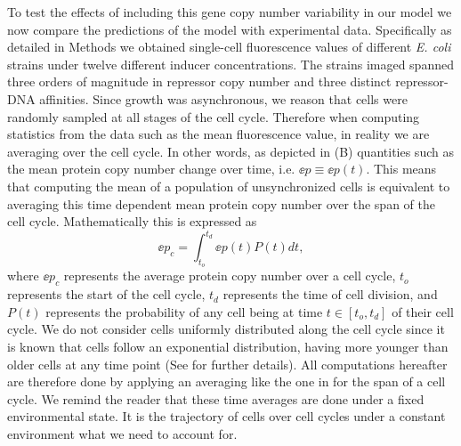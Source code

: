 To test the effects of including this gene copy number variability in our model
we now compare the predictions of the model with experimental data.
Specifically as detailed in Methods we obtained single-cell fluorescence values
of different {\it E. coli} strains under twelve different inducer
concentrations. The strains imaged spanned three orders of magnitude in
repressor copy number and three distinct repressor-DNA affinities. Since growth
was asynchronous, we reason that cells were randomly sampled at all stages of
the cell cycle. Therefore when computing statistics from the data such as the
mean fluorescence value, in reality we are averaging over the cell cycle. In
other words, as depicted in (B) quantities such as the
mean protein copy number change over time, i.e. $\ee{p} \equiv \ee{p(t)}$. This
means that computing the mean of a population of unsynchronized cells is
equivalent to averaging this time dependent mean protein copy number over the
span of the cell cycle. Mathematically this is expressed as
\begin{equation}
	\ee{p}_c = \int_{t_o}^{t_d} \ee{p(t)} P(t) dt,
	\label{eq_time_avg}
\end{equation}
where $\ee{p}_c$ represents the average protein copy number over a cell cycle,
$t_o$ represents the start of the cell cycle, $t_d$ represents the time of cell
division, and $P(t)$ represents the probability of any cell being at time $t
\in [t_o, t_d]$ of their cell cycle. We do not consider cells uniformly
distributed along the cell cycle since it is known that cells follow an
exponential distribution, having more younger than older cells at any time
point \cite{Powell1956} (See  for further details).
All computations hereafter are therefore done by applying an averaging like the
one in  for the span of a cell cycle. We remind the reader
that these time averages are done under a fixed environmental state. It is the
trajectory of cells over cell cycles under a constant environment what we need
to account for.

